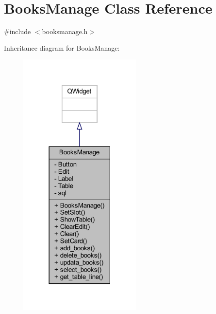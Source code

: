 \hypertarget{class_books_manage}{}\section{Books\+Manage Class Reference}
\label{class_books_manage}


{\ttfamily \#include $<$booksmanage.\+h$>$}



Inheritance diagram for Books\+Manage\+:
\nopagebreak
\begin{figure}[H]
\begin{center}
\leavevmode
\includegraphics[width=174pt]{class_books_manage__inherit__graph}
\end{center}
\end{figure}


